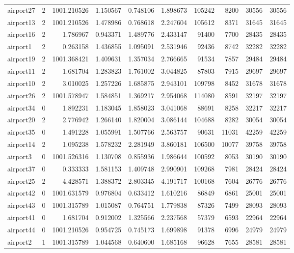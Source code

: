 \begin{longtable}{|l|r|r|r|r|r|r|r|r|r|}
airport27 & 2 & 1001.210526 & 1.150567 & 0.748106 & 1.898673 & 105242 & 8200 & 30556 & 30556 \\
airport13 & 2 & 1001.210526 & 1.478986 & 0.768618 & 2.247604 & 105612 & 8371 & 31645 & 31645 \\
airport16 & 2 & 1.786967 & 0.943371 & 1.489776 & 2.433147 & 91400 & 7700 & 28435 & 28435 \\
airport1 & 2 & 0.263158 & 1.436855 & 1.095091 & 2.531946 & 92436 & 8742 & 32282 & 32282 \\
airport19 & 2 & 1001.368421 & 1.409631 & 1.357034 & 2.766665 & 91534 & 7857 & 29484 & 29484 \\
airport11 & 2 & 1.681704 & 1.283823 & 1.761002 & 3.044825 & 87803 & 7915 & 29697 & 29697 \\
airport10 & 2 & 3.010025 & 1.257226 & 1.685875 & 2.943101 & 109798 & 8452 & 31678 & 31678 \\
airport26 & 2 & 1001.578947 & 1.584851 & 1.369217 & 2.954068 & 114080 & 8591 & 32197 & 32197 \\
airport34 & 0 & 1.892231 & 1.183045 & 1.858023 & 3.041068 & 88691 & 8258 & 32217 & 32217 \\
airport20 & 2 & 2.776942 & 1.266140 & 1.820004 & 3.086144 & 104688 & 8282 & 30054 & 30054 \\
airport35 & 0 & 1.491228 & 1.055991 & 1.507766 & 2.563757 & 90631 & 11031 & 42259 & 42259 \\
airport14 & 2 & 1.095238 & 1.578232 & 2.281949 & 3.860181 & 106500 & 10077 & 39758 & 39758 \\
airport3 & 0 & 1001.526316 & 1.130708 & 0.855936 & 1.986644 & 100592 & 8053 & 30190 & 30190 \\
airport37 & 0 & 0.333333 & 1.581153 & 1.409748 & 2.990901 & 109268 & 7981 & 28424 & 28424 \\
airport25 & 2 & 4.428571 & 1.388372 & 2.803345 & 4.191717 & 100168 & 7604 & 26776 & 26776 \\
airport42 & 0 & 1001.631579 & 0.976804 & 0.633412 & 1.610216 & 86849 & 6861 & 25001 & 25001 \\
airport43 & 0 & 1001.315789 & 1.015087 & 0.764751 & 1.779838 & 87326 & 7499 & 28093 & 28093 \\
airport41 & 0 & 1.681704 & 0.912002 & 1.325566 & 2.237568 & 57379 & 6593 & 22964 & 22964 \\
airport44 & 0 & 1001.210526 & 0.954725 & 0.745173 & 1.699898 & 91378 & 6996 & 24979 & 24979 \\
airport2 & 1 & 1001.315789 & 1.044568 & 0.640600 & 1.685168 & 96628 & 7655 & 28581 & 28581 \\

\end{longtable}
